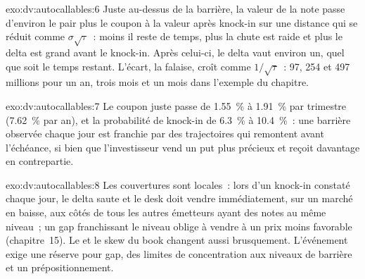 \begin{solution}{exo:dv:autocallables:6}
Juste au-dessus de la barrière, la valeur de la note passe d'environ le pair plus le coupon à la valeur après knock-in sur une distance qui se réduit comme
$\sigma\sqrt\tau$~: moins il reste de temps, plus la chute est raide et plus le delta est grand avant le knock-in. Après celui-ci, le delta vaut environ
un, quel que soit le temps restant. L'écart, la falaise, croît comme $1/\sqrt\tau$~: 97, 254 et 497 millions pour un an, trois mois et un
mois dans l'exemple du chapitre.
\end{solution}

\begin{solution}{exo:dv:autocallables:7}
Le coupon juste passe de 1.55~\% à 1.91~\% par trimestre (7.62~\% par an), et la probabilité de knock-in de 6.3~\% à 10.4~\%~: une barrière observée
chaque jour est franchie par des trajectoires qui remontent avant l'échéance, si bien que l'investisseur vend un put plus précieux et reçoit davantage en contrepartie.
\end{solution}

\begin{solution}{exo:dv:autocallables:8}
Les couvertures sont locales~: lors d'un knock-in constaté chaque jour, le delta saute et le desk doit vendre immédiatement, sur un marché en baisse, aux côtés de tous les autres
émetteurs ayant des notes au même niveau~; un gap franchissant le niveau oblige à vendre à un prix moins favorable (chapitre~15). Le  et le skew du book
changent aussi brusquement. L'événement exige une réserve pour gap, des limites de concentration aux niveaux de barrière et un prépositionnement.
\end{solution}

